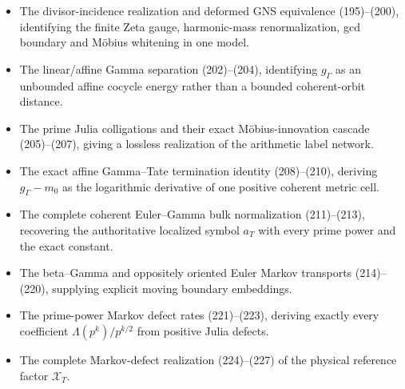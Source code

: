 \documentclass[11pt]{article}
\begin{document}
\begin{itemize}
      observation, and joint Euler--Gamma boundary (187)--(194).
\item The divisor-incidence realization and deformed GNS equivalence
      (195)--(200), identifying the finite Zeta gauge, harmonic-mass
      renormalization, gcd boundary and M\"obius whitening in one model.
\item The linear/affine Gamma separation (202)--(204), identifying
      $g_\Gamma$ as an unbounded affine cocycle energy rather than a bounded
      coherent-orbit distance.
\item The prime Julia colligations and their exact M\"obius-innovation
      cascade (205)--(207), giving a lossless realization of the arithmetic
      label network.
\item The exact affine Gamma--Tate termination identity (208)--(210), deriving
      $g_\Gamma-m_0$ as the logarithmic derivative of one positive coherent
      metric cell.
\item The complete coherent Euler--Gamma bulk normalization (211)--(213),
      recovering the authoritative localized symbol $a_T$ with every prime
      power and the exact constant.
\item The beta--Gamma and oppositely oriented Euler Markov transports
      (214)--(220), supplying explicit moving boundary embeddings.
\item The prime-power Markov defect rates (221)--(223), deriving exactly
      every coefficient $\Lambda(p^k)/p^{k/2}$ from positive Julia defects.
\item The complete Markov-defect realization (224)--(227) of the physical
      reference factor $\mathcal X_T$.
\end{itemize}
\end{document}
